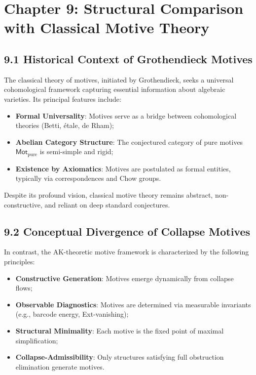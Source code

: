 \documentclass[11pt]{article}
\begin{document}
\section{Chapter 9: Structural Comparison with Classical Motive Theory}

\subsection{9.1 Historical Context of Grothendieck Motives}

The classical theory of motives, initiated by Grothendieck, seeks a universal cohomological framework capturing essential information about algebraic varieties. Its principal features include:

\begin{itemize}
    \item \textbf{Formal Universality}: Motives serve as a bridge between cohomological theories (Betti, étale, de Rham);
    \item \textbf{Abelian Category Structure}: The conjectured category of pure motives $\mathsf{Mot}_{\mathrm{pure}}$ is semi-simple and rigid;
    \item \textbf{Existence by Axiomatics}: Motives are postulated as formal entities, typically via correspondences and Chow groups.
\end{itemize}

Despite its profound vision, classical motive theory remains abstract, non-constructive, and reliant on deep standard conjectures.

\subsection{9.2 Conceptual Divergence of Collapse Motives}

In contrast, the AK-theoretic motive framework is characterized by the following principles:

\begin{itemize}
    \item \textbf{Constructive Generation}: Motives emerge dynamically from collapse flows;
    \item \textbf{Observable Diagnostics}: Motives are determined via measurable invariants (e.g., barcode energy, Ext-vanishing);
    \item \textbf{Structural Minimality}: Each motive is the fixed point of maximal simplification;
    \item \textbf{Collapse-Admissibility}: Only structures satisfying full obstruction elimination generate motives.
\end{itemize}
\end{document}
